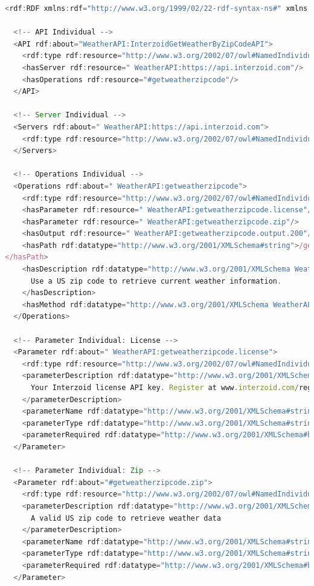\begin{appendix}
\begin{lstlisting}[language=JavaScript, captionpos=t, caption=Component Ontology individuals]
<rdf:RDF xmlns:rdf="http://www.w3.org/1999/02/22-rdf-syntax-ns#" xmlns:owl="http://www.w3.org/2002/07/owl#">

  <!-- API Individual -->
  <API rdf:about="WeatherAPI:InterzoidGetWeatherByZipCodeAPI">
    <rdf:type rdf:resource="http://www.w3.org/2002/07/owl#NamedIndividual"/>
    <hasServer rdf:resource=" WeatherAPI:https://api.interzoid.com"/>
    <hasOperations rdf:resource="#getweatherzipcode"/>
  </API>

  <!-- Server Individual -->
  <Servers rdf:about=" WeatherAPI:https://api.interzoid.com">
    <rdf:type rdf:resource="http://www.w3.org/2002/07/owl#NamedIndividual"/>
  </Servers>

  <!-- Operations Individual -->
  <Operations rdf:about=" WeatherAPI:getweatherzipcode">
    <rdf:type rdf:resource="http://www.w3.org/2002/07/owl#NamedIndividual"/>
    <hasParameter rdf:resource=" WeatherAPI:getweatherzipcode.license"/>
    <hasParameter rdf:resource=" WeatherAPI:getweatherzipcode.zip"/>
    <hasOutput rdf:resource=" WeatherAPI:getweatherzipcode.output.200"/>
    <hasPath rdf:datatype="http://www.w3.org/2001/XMLSchema#string">/getweatherzipcode
</hasPath>
    <hasDescription rdf:datatype="http://www.w3.org/2001/XMLSchema WeatherAPI:string">
      Use a US zip code to retrieve current weather information.
    </hasDescription>
    <hasMethod rdf:datatype="http://www.w3.org/2001/XMLSchema WeatherAPI:string">get</hasMethod>
  </Operations>

  <!-- Parameter Individual: License -->
  <Parameter rdf:about=" WeatherAPI:getweatherzipcode.license">
    <rdf:type rdf:resource="http://www.w3.org/2002/07/owl#NamedIndividual"/>
    <parameterDescription rdf:datatype="http://www.w3.org/2001/XMLSchema#string">
      Your Interzoid license API key. Register at www.interzoid.com/register
    </parameterDescription>
    <parameterName rdf:datatype="http://www.w3.org/2001/XMLSchema#string">license</parameterName>
    <parameterType rdf:datatype="http://www.w3.org/2001/XMLSchema#string">string</parameterType>
    <parameterRequired rdf:datatype="http://www.w3.org/2001/XMLSchema#boolean">true</parameterRequired>
  </Parameter>

  <!-- Parameter Individual: Zip -->
  <Parameter rdf:about="#getweatherzipcode.zip">
    <rdf:type rdf:resource="http://www.w3.org/2002/07/owl#NamedIndividual"/>
    <parameterDescription rdf:datatype="http://www.w3.org/2001/XMLSchema#string">
      A valid US zip code to retrieve weather data
    </parameterDescription>
    <parameterName rdf:datatype="http://www.w3.org/2001/XMLSchema#string">zip</parameterName>
    <parameterType rdf:datatype="http://www.w3.org/2001/XMLSchema#string">string</parameterType>
    <parameterRequired rdf:datatype="http://www.w3.org/2001/XMLSchema#boolean">true</parameterRequired>
  </Parameter>


\end{lstlisting}
\end{appendix}
